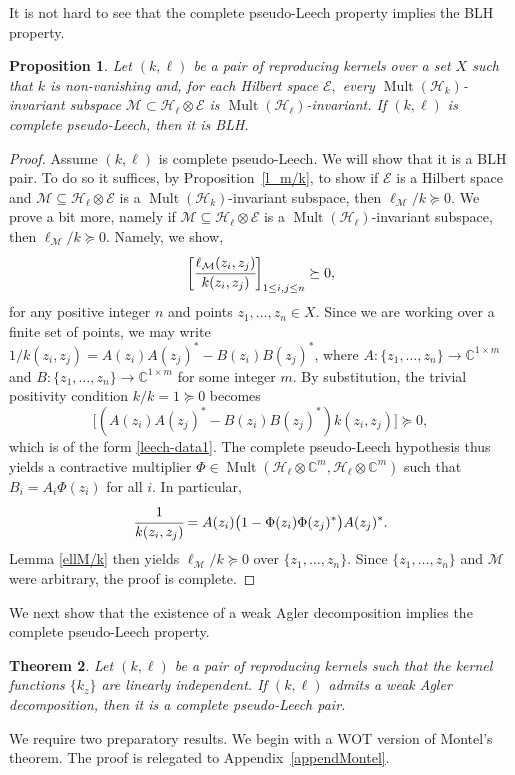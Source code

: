 \documentclass[a4paper,reqno,index]{amsart}
\numberwithin{equation}{section}
\newtheorem{theorem}{Theorem}[section]
\newcommand{\Mult}{\operatorname{Mult}}
\newcommand{\cM}{\mathcal{M}}
\newcommand{\cH}{\mathcal{H}}
\newcommand{\HSE}{\mathcal{E}}
\newcommand{\opphi}[4]{{#1}\in \Mult({#3},{#4})}
\newtheorem{proposition}[theorem]{Proposition}
\theoremstyle{definition}
\begin{document}
It is not hard to see that the complete pseudo-Leech property implies the BLH property. 

\begin{proposition}\label{LeechtoBLH}
   Let $(k, \ell)$ be a pair of reproducing kernels over a set $X$ such that $k$ is non-vanishing and,
 for  each Hilbert space $\HSE,$  every $\Mult(\cH_k)$-invariant subspace $\mathcal{M}\subset\mathcal{H}_{\ell}\otimes\mathcal{E}$ is 
 $\Mult(\cH_{\ell})$-invariant. If $(k, \ell)$ is complete pseudo-Leech, then it is BLH.
\end{proposition}


\begin{proof} 
Assume $(k, \ell)$ is complete pseudo-Leech. We will show that it is a BLH pair.  To do so it suffices, by
Proposition~\ref{l_m/k}, to show if $\HSE$ is a Hilbert
space and $\cM\subseteq \cH_\ell\otimes \HSE$ 
is  a $\Mult(\cH_k)$-invariant  subspace, then $\ell_{\cM}/k\succeq 0.$ We prove a bit more, namely if $\cM\subseteq \cH_\ell\otimes \HSE$ 
is a $\Mult(\cH_\ell)$-invariant subspace, then $\ell_{\cM}/k\succeq 0.$
 Namely, we show,
\begin{equation*} %
    \bigg[\cfrac{\ell_{\mathcal{M}}(z_i, z_j)}{k(z_i, z_j)}\bigg]_{1\le i, j\le n}\succeq 0,
\end{equation*}
for any positive integer $n$ and points $z_1, \dots, z_n\in X.$
 Since we are working over a finite set of points, we may write $1/k(z_i,z_j)=A(z_i)A(z_j)^*-B(z_i)B(z_j)^*$, where $A: \{z_1, \dots, z_n\}\to\mathbb{C}^{1\times m}$ and 
$B: \{z_1, \dots, z_n\}\to\mathbb{C}^{1\times m}$ for some integer $m$.  By substitution, the  trivial positivity condition $k/k=1\succeq 0$  becomes
\[\big[(A(z_i)A(z_j)^*-B(z_i)B(z_j)^*)k(z_i, z_j)\big]\succeq 0,\]
which is of the form \eqref{leech-data1}. The complete pseudo-Leech hypothesis thus yields a
contractive multiplier $\opphi{\Phi}{X}{ \mathcal{H}_{\ell}\otimes \mathbb{C}^m}{  \mathcal{H}_{\ell}\otimes \mathbb{C}^m}$
 such that $B_i=A_i\Phi(z_i)$ for all $i$. In particular, 
 \[\cfrac{1}{k(z_i, z_j)}=A(z_i)\big(1-\Phi(z_i)\Phi(z_j)^* \big)A(z_j)^*. \]
 Lemma \ref{ellM/k} then yields $\ell_{\mathcal{M}}/k\succeq 0$ over $\{z_1, \dots, z_n\}.$ Since $\{z_1, \dots, z_n\}$ and $\mathcal{M}$ were arbitrary, the proof is complete. 
\end{proof}


We next show that the existence of a weak Agler decomposition implies the complete pseudo-Leech property.  

\begin{theorem}\label{AglerdectoLeech}
Let $(k, \ell)$ be a pair of reproducing kernels such that the kernel functions $\{k_z\}$ are linearly independent. If $(k, \ell)$ admits a weak Agler decomposition, then it is a complete pseudo-Leech pair.
\end{theorem}
We require two preparatory results. We begin with a WOT version of Montel's theorem. The proof   is relegated to Appendix~\ref{appendMontel}.
\end{document}
